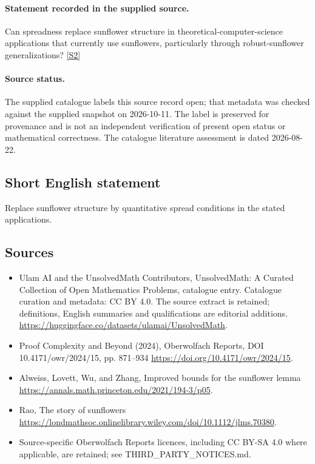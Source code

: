 \documentclass[11pt]{article}
\begin{document}
\paragraph{Statement recorded in the supplied source.}
Can spreadness replace sunflower structure in theoretical-computer-science applications that currently use sunflowers, particularly through robust-sunflower generalizations? \href{https://doi.org/10.4171/owr/2024/15}{[S2]}
\paragraph{Source status.}
The supplied catalogue labels this source record open; that metadata was checked against the supplied snapshot on 2026-10-11. The label is preserved for provenance and is not an independent verification of present open status or mathematical correctness. The catalogue literature assessment is dated 2026-08-22.
\subsection{Short English statement}
Replace sunflower structure by quantitative spread conditions in the stated applications.
\subsection{Sources}
\begin{itemize}
\item[S1] Ulam AI and the UnsolvedMath Contributors, UnsolvedMath: A Curated Collection of Open Mathematics Problems, catalogue entry. Catalogue curation and metadata: CC BY 4.0. The source extract is retained; definitions, English summaries and qualifications are editorial additions.
\url{https://huggingface.co/datasets/ulamai/UnsolvedMath}.
\item[S2] Proof Complexity and Beyond (2024), Oberwolfach Reports, DOI 10.4171/owr/2024/15, pp. 871--934
\url{https://doi.org/10.4171/owr/2024/15}.
\item[S3] Alweiss, Lovett, Wu, and Zhang, Improved bounds for the sunflower lemma
\url{https://annals.math.princeton.edu/2021/194-3/p05}.
\item[S4] Rao, The story of sunflowers
\url{https://londmathsoc.onlinelibrary.wiley.com/doi/10.1112/jlms.70380}.
\item Source-specific Oberwolfach Reports licences, including CC BY-SA 4.0 where applicable, are retained; see THIRD\_PARTY\_NOTICES.md.
\end{itemize}
\end{document}
